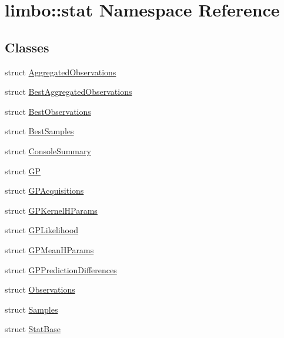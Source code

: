 \hypertarget{namespacelimbo_1_1stat}{}\section{limbo\+:\+:stat Namespace Reference}
\label{namespacelimbo_1_1stat}
\subsection*{Classes}
\begin{DoxyCompactItemize}
\item 
struct \hyperlink{structlimbo_1_1stat_1_1_aggregated_observations}{Aggregated\+Observations}
\item 
struct \hyperlink{structlimbo_1_1stat_1_1_best_aggregated_observations}{Best\+Aggregated\+Observations}
\item 
struct \hyperlink{structlimbo_1_1stat_1_1_best_observations}{Best\+Observations}
\item 
struct \hyperlink{structlimbo_1_1stat_1_1_best_samples}{Best\+Samples}
\item 
struct \hyperlink{structlimbo_1_1stat_1_1_console_summary}{Console\+Summary}
\item 
struct \hyperlink{structlimbo_1_1stat_1_1_g_p}{GP}
\item 
struct \hyperlink{structlimbo_1_1stat_1_1_g_p_acquisitions}{G\+P\+Acquisitions}
\item 
struct \hyperlink{structlimbo_1_1stat_1_1_g_p_kernel_h_params}{G\+P\+Kernel\+H\+Params}
\item 
struct \hyperlink{structlimbo_1_1stat_1_1_g_p_likelihood}{G\+P\+Likelihood}
\item 
struct \hyperlink{structlimbo_1_1stat_1_1_g_p_mean_h_params}{G\+P\+Mean\+H\+Params}
\item 
struct \hyperlink{structlimbo_1_1stat_1_1_g_p_prediction_differences}{G\+P\+Prediction\+Differences}
\item 
struct \hyperlink{structlimbo_1_1stat_1_1_observations}{Observations}
\item 
struct \hyperlink{structlimbo_1_1stat_1_1_samples}{Samples}
\item 
struct \hyperlink{structlimbo_1_1stat_1_1_stat_base}{Stat\+Base}
\end{DoxyCompactItemize}
